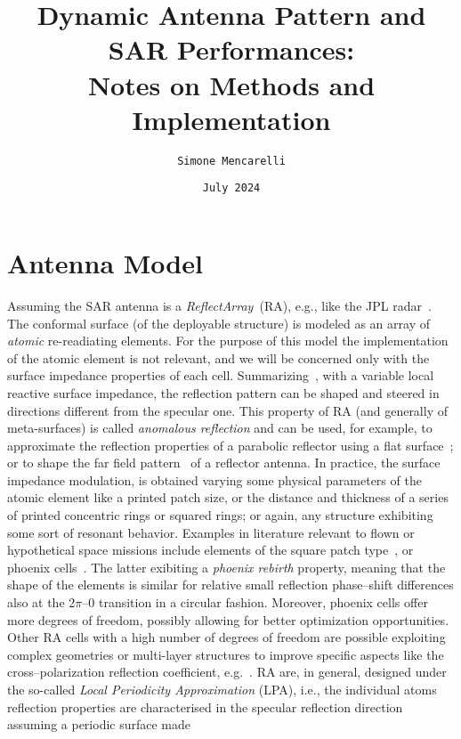 \documentclass[11pt, a4paper]{scrartcl}
\title{Dynamic Antenna Pattern and SAR Performances: \\Notes on Methods and Implementation}
\author{\texttt{Simone Mencarelli}}
\date{\small{\texttt{July 2024}}}
\begin{document}
    \maketitle
    \section{Antenna Model}
    \label{sec:antenna_model}
    Assuming the SAR antenna is a \emph{ReflectArray}~(RA), e.g., like the JPL radar~\cite{swot}.
    The conformal surface (of the deployable structure) is modeled as an array of \emph{atomic} re-readiating elements.
    For the purpose of this model the implementation of the atomic element is not relevant, and we will be concerned only
    with the surface impedance properties of each cell.
    Summarizing~\cite{MetaTutorialLiu2023}, with a variable local reactive surface impedance, the reflection pattern can
    be shaped and steered in directions different from the specular one.
    This property of RA (and generally of meta-surfaces) is called \emph{anomalous reflection} and can be used, for example, to approximate the reflection properties
    of a parabolic reflector using a flat surface~\cite{rapozar}; or to shape the far field pattern~\cite{Guarrielllo} of a reflector antenna.
    In practice, the surface impedance modulation, is obtained varying some physical parameters of the atomic element
    like a printed patch size, or the distance and thickness of a series of printed concentric rings or squared rings;
    or again, any structure exhibiting some sort of resonant behavior.
    Examples in literature relevant to flown or hypothetical space missions include elements of the square patch
    type~\cite{swot,marco,isara}, or phoenix cells~\cite{Guarrielllo,secondphoenix}.
    The latter exibiting a \emph{phoenix rebirth} property, meaning that the shape of the elements is similar for
    relative small reflection phase--shift differences also at the 2$\pi$--0 transition in a circular fashion.
    Moreover, phoenix cells offer more degrees of freedom, possibly allowing for better optimization opportunities.
    Other RA cells with a high number of degrees of freedom are possible exploiting complex geometries or multi-layer structures
    to improve specific aspects like the cross--polarization reflection coefficient, e.g.~\cite{PradoCrosspolar2017}.
    RA are, in general, designed under the so-called \emph{Local Periodicity Approximation} (LPA), i.e., the individual
    atoms reflection properties are characterised in the specular reflection direction assuming a periodic surface made
\end{document}
